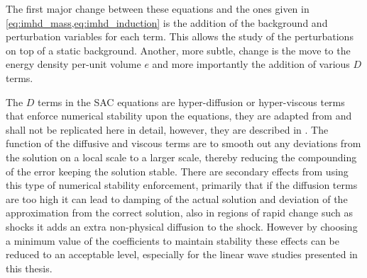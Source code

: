 The first major change between these equations and the ones given in \cref{eq:imhd_mass,eq:imhd_induction} is the addition of the background and perturbation variables for each term.
This allows the study of the perturbations on top of a static background.
Another, more subtle, change is the move to the energy density per-unit volume $e$ and more importantly the addition of various $D$ terms.

The $D$ terms in the SAC equations are hyper-diffusion or hyper-viscous terms that enforce numerical stability upon the equations, they are adapted from \cite{nordlund1995} and shall not be replicated here in detail, however, they are described in \citet{shelyag2008}.
The function of the diffusive and viscous terms are to smooth out any deviations from the solution on a local scale to a larger scale, thereby reducing the compounding of the error keeping the solution stable.
There are secondary effects from using this type of numerical stability enforcement, primarily that if the diffusion terms are too high it can lead to damping of the actual solution and deviation of the approximation from the correct solution, also in regions of rapid change such as shocks it adds an extra non-physical diffusion to the shock.
However by choosing a minimum value of the coefficients to maintain stability these effects can be reduced to an acceptable level, especially for the linear wave studies presented in this thesis.

